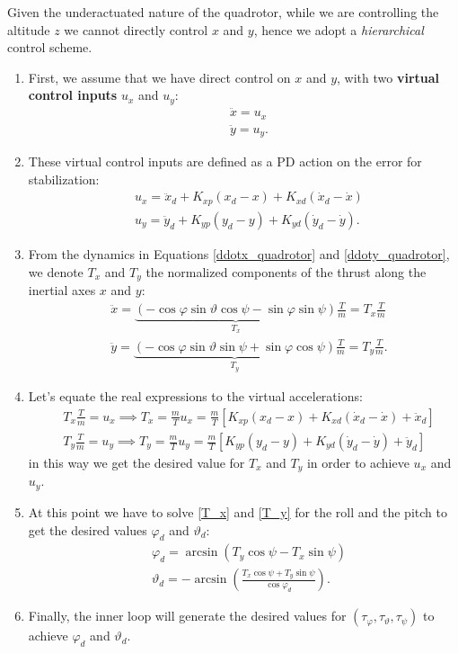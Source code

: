\documentclass[10pt, a4paper]{report}
\begin{document}
Given the underactuated nature of the quadrotor, while we are controlling the altitude $z$ we cannot directly control $x$ and $y$, hence we adopt a \textit{hierarchical} control scheme.
\begin{enumerate}
    \item First, we assume that we have direct control on $x$ and $y$, with two \textbf{virtual control inputs} $u_x$ and $u_y$:\begin{align}
        &\ddot x=u_x\\ 
        &\ddot y=u_y.
    \end{align}
    \item These virtual control inputs are defined as a PD action on the error for stabilization:\begin{align}
        &u_x=\ddot x_d+K_{xp}(x_d-x)+K_{xd}(\dot x_d-\dot x)\\
        &u_y=\ddot y_d+K_{yp}(y_d-y)+K_{yd}(\dot y_d-\dot y).
    \end{align}
    \item From the dynamics in Equations \eqref{ddotx_quadrotor} and \eqref{ddoty_quadrotor}, we denote $T_x$ and $T_y$ the normalized components of the thrust along the inertial axes $x$ and $y$:\begin{align}
        &\ddot{x} = \underbrace{(-\cos\varphi \sin\vartheta \cos\psi - \sin\varphi \sin\psi)}_{T_x} \frac{T}{m}=T_x\frac{T}{m}\label{T_x}\\
        &\ddot{y} = \underbrace{(-\cos\varphi \sin\vartheta \sin\psi + \sin\varphi \cos\psi)}_{T_y} \frac{T}{m}=T_y\frac{T}{m}.\label{T_y}
    \end{align}
    \item Let's equate the real expressions to the virtual accelerations:\begin{align}
        &T_x \frac{T}{m} = u_x \implies T_x = \frac{m}{T} u_x = \frac{m}{T} \left[ K_{xp}(x_d - x) + K_{xd}(\dot{x}_d - \dot{x}) + \ddot{x}_d \right]\\
        &T_y \frac{T}{m} = u_y \implies T_y = \frac{m}{T} u_y = \frac{m}{T} \left[ K_{yp}(y_d - y) + K_{yd}(\dot{y}_d - \dot{y}) + \ddot{y}_d \right]
    \end{align}
    in this way we get the desired value for $T_x$ and $T_y$ in order to achieve $u_x$ and $u_y$.
    \item At this point we have to solve \eqref{T_x} and \eqref{T_y} for the roll and the pitch to get the desired values $\varphi_d$ and $\vartheta_d$:\begin{align}
        &\varphi_d=\arcsin\left(T_y\cos\psi-T_x\sin\psi\right)\\ 
        &\vartheta_d=-\arcsin\left(\frac{T_x\cos\psi+T_y\sin\psi}{\cos\varphi_d}\right).
    \end{align}
    \item Finally, the inner loop will generate the desired values for $(\tau_\varphi, \tau_\vartheta, \tau_\psi)$ to achieve $\varphi_d$ and $\vartheta_d$.
\end{enumerate}
\end{document}
